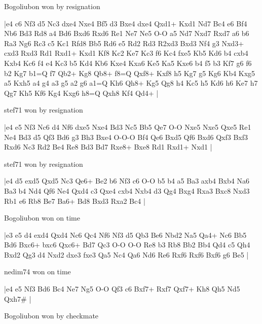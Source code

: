 \showboard

Bogoliubon won by resignation

\makegametitle
|e4 c6 Nf3 d5 Nc3 dxe4 Nxe4 Bf5 d3 Bxe4 dxe4 Qxd1+ Kxd1 Nd7 Bc4 e6 Bf4 Nb6 Bd3 Rd8 a4 Bd6 Bxd6 Rxd6 Re1 Ne7 Ne5 O-O a5 Nd7 Nxd7 Rxd7 a6 b6 Ra3 Ng6 Rc3 c5 Kc1 Rfd8 Bb5 Rd6 e5 Rd2 Rd3 R2xd3 Bxd3 Nf4 g3 Nxd3+ cxd3 Rxd3 Rd1 Rxd1+ Kxd1 Kf8 Kc2 Ke7 Kc3 f6 Kc4 fxe5 Kb5 Kd6 b4 cxb4 Kxb4 Kc6 f4 e4 Kc3 b5 Kd4 Kb6 Kxe4 Kxa6 Ke5 Ka5 Kxe6 b4 f5 b3 Kf7 g6 f6 b2 Kg7 b1=Q f7 Qb2+ Kg8 Qb8+ f8=Q Qxf8+ Kxf8 h5 Kg7 g5 Kg6 Kb4 Kxg5 a5 Kxh5 a4 g4 a3 g5 a2 g6 a1=Q Kh6 Qh8+ Kg5 Qg8 h4 Kc5 h5 Kd6 h6 Ke7 h7 Qg7 Kh5 Kf6 Kg4 Kxg6 h8=Q Qxh8 Kf4 Qd4+  |

\showboard

stef71 won by resignation

\makegametitle
|e4 e5 Nf3 Nc6 d4 Nf6 dxe5 Nxe4 Bd3 Nc5 Bb5 Qe7 O-O Nxe5 Nxe5 Qxe5 Re1 Ne4 Bd3 d5 Qf3 Bd6 g3 Bh3 Bxe4 O-O-O Bf4 Qe6 Bxd5 Qf6 Bxd6 Qxf3 Bxf3 Rxd6 Nc3 Rd2 Be4 Re8 Bd3 Bd7 Rxe8+ Bxe8 Rd1 Rxd1+ Nxd1  |

\showboard

stef71 won by resignation

\makegametitle
|e4 d5 exd5 Qxd5 Nc3 Qe6+ Be2 b6 Nf3 c6 O-O b5 b4 a5 Ba3 axb4 Bxb4 Na6 Ba3 b4 Nd4 Qf6 Ne4 Qxd4 c3 Qxe4 cxb4 Nxb4 d3 Qg4 Bxg4 Rxa3 Bxc8 Nxd3 Rb1 e6 Rb8 Be7 Ba6+ Bd8 Bxd3 Rxa2 Bc4  |

\showboard

Bogoliubon won on time

\makegametitle
|e3 e5 d4 exd4 Qxd4 Nc6 Qc4 Nf6 Nf3 d5 Qb3 Be6 Nbd2 Na5 Qa4+ Nc6 Bb5 Bd6 Bxc6+ bxc6 Qxc6+ Bd7 Qc3 O-O O-O Re8 b3 Rb8 Bb2 Bb4 Qd4 c5 Qh4 Bxd2 Qg3 d4 Nxd2 dxe3 fxe3 Qa5 Nc4 Qa6 Nd6 Re6 Rxf6 Rxf6 Bxf6 g6 Be5  |

\showboard

nedim74 won on time

\makegametitle
|e4 e5 Nf3 Bd6 Bc4 Ne7 Ng5 O-O Qf3 c6 Bxf7+ Rxf7 Qxf7+ Kh8 Qh5 Nd5 Qxh7\#  |

\showboard

Bogoliubon won by checkmate

